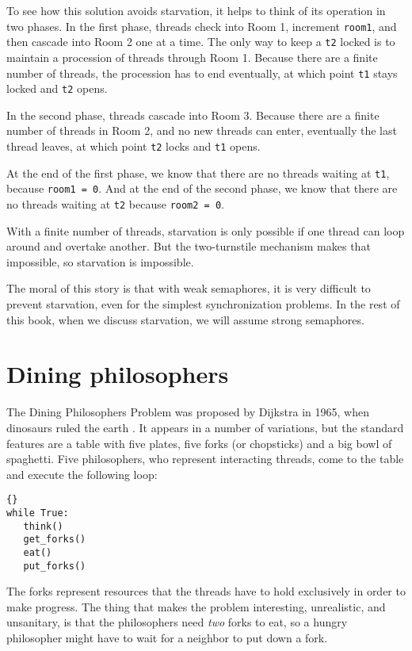 \documentclass{book}
\newcommand{\clearemptydoublepage}{\newpage\cleardoublepage}
\begin{document}
To see how this solution avoids starvation, it helps to think of its
operation in two phases.  In the first phase, threads check into Room
1, increment {\tt room1}, and then cascade into Room 2 one at a time.
The only way to keep a {\tt t2} locked is to maintain a
procession of threads through Room 1.  Because there are a finite
number of threads, the procession has to end eventually, at which
point {\tt t1} stays locked and {\tt t2} opens.

In the second phase, threads cascade into Room 3.  
Because there are a finite number of threads in Room 2, and
no new threads can enter, eventually the last thread leaves, at
which point {\tt t2} locks and {\tt t1} opens.

At the end of the first phase, we know that there are no threads
waiting at {\tt t1}, because {\tt room1 = 0}.  And at the end of the
second phase, we know that there are no threads waiting at {\tt t2}
because {\tt room2 = 0}.

With a finite number of threads, starvation is only possible if one
thread can loop around and overtake another.  But the two-turnstile
mechanism makes that impossible, so starvation is impossible.

The moral of this story is that with weak semaphores, it is very
difficult to prevent starvation, even for the simplest synchronization
problems.  In the rest of this book, when we discuss starvation, we
will assume strong semaphores.



\clearemptydoublepage
\section{Dining philosophers}
\label{dining}

The Dining Philosophers Problem was proposed by Dijkstra in
1965, when dinosaurs ruled the earth \cite{dijkstra65}.  It
appears in a number of variations, but the standard features
are a table with five plates, five forks (or chopsticks) and
a big bowl of spaghetti.  Five philosophers, who represent
interacting threads, come to the table and execute the
following loop:

\begin{lstlisting}[title={Basic philosopher loop}]{}
while True:
   think()
   get_forks()
   eat()
   put_forks()
\end{lstlisting}

The forks represent resources that the threads have to hold
exclusively in order to make progress.  The thing that makes the
problem interesting, unrealistic, and unsanitary, is that the
philosophers need {\em two} forks to eat, so a hungry philosopher
might have to wait for a neighbor to put down a fork.
\end{document}
